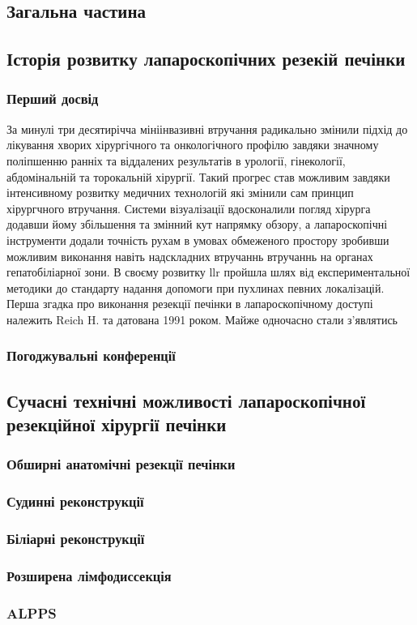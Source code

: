 \begin{refsection}
\chapter{Загальна частина}
\section{Історія розвитку лапароскопічних резекій печінки}
\subsection{Перший досвід}
За минулі три десятирічча мініінвазивні втручання радикально змінили підхід до лікування хворих хірургічного та онкологічного профілю  завдяки значному поліпшенню ранніх та віддалених результатів в урології, гінекології, абдомінальній та торокальній хірургії. Такий прогрес став можливим завдяки інтенсивному розвитку медичних технологій які змінили сам принцип хірургчного втручання. Системи візуалізації вдосконалили погляд хірурга додавши йому збільшення та змінний кут напрямку обзору, а лапароскопічні інструменти додали точність рухам в умовах обмеженого простору зробивши можливим виконання навіть надскладних втручаннь втручаннь на органах гепатобіліарної зони. 
В своєму розвитку \acrfull{llr} пройшла шлях від експериментальної методики до стандарту надання допомоги при пухлинах певних локалізацій\cite{AbuHilal2017a}. Перша згадка про виконання резекції печінки в лапароскопічному доступі належить Reich H. \cite{Reich1991a} та датована 1991 роком. Майже одночасно стали з'являтись  

\subsection{Погоджувальні конференції}
\section{Сучасні технічні можливості лапароскопічної резекційної хірургії печінки}
\subsection{Обширні анатомічні резекції печінки}
\subsection{Судинні реконструкції}
\subsection{Біліарні реконструкції}
\subsection{Розширена лімфодиссекція}
\subsection{ALPPS}
\printbibliography[heading=subbibliography]
\end{refsection}


